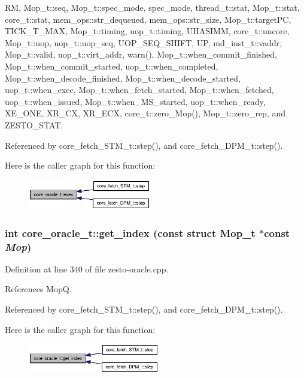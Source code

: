 RM, Mop\_\-t::seq, Mop\_\-t::spec\_\-mode, spec\_\-mode, thread\_\-t::stat, Mop\_\-t::stat, core\_\-t::stat, mem\_\-ops::str\_\-dequeued, mem\_\-ops::str\_\-size, Mop\_\-t::targetPC, TICK\_\-T\_\-MAX, Mop\_\-t::timing, uop\_\-t::timing, UHASIMM, core\_\-t::uncore, Mop\_\-t::uop, uop\_\-t::uop\_\-seq, UOP\_\-SEQ\_\-SHIFT, UP, md\_\-inst\_\-t::vaddr, Mop\_\-t::valid, uop\_\-t::virt\_\-addr, warn(), Mop\_\-t::when\_\-commit\_\-finished, Mop\_\-t::when\_\-commit\_\-started, uop\_\-t::when\_\-completed, Mop\_\-t::when\_\-decode\_\-finished, Mop\_\-t::when\_\-decode\_\-started, uop\_\-t::when\_\-exec, Mop\_\-t::when\_\-fetch\_\-started, Mop\_\-t::when\_\-fetched, uop\_\-t::when\_\-issued, Mop\_\-t::when\_\-MS\_\-started, uop\_\-t::when\_\-ready, XE\_\-ONE, XR\_\-CX, XR\_\-ECX, core\_\-t::zero\_\-Mop(), Mop\_\-t::zero\_\-rep, and ZESTO\_\-STAT.

Referenced by core\_\-fetch\_\-STM\_\-t::step(), and core\_\-fetch\_\-DPM\_\-t::step().

Here is the caller graph for this function:\nopagebreak
\begin{figure}[H]
\begin{center}
\leavevmode
\includegraphics[width=152pt]{classcore__oracle__t_1ac2b1204cef575e22d1d03c3ce4cff9_icgraph}
\end{center}
\end{figure}
\subsubsection[{get\_\-index}]{\setlength{\rightskip}{0pt plus 5cm}int core\_\-oracle\_\-t::get\_\-index (const struct {\bf Mop\_\-t} $\ast$const  {\em Mop})}\label{classcore__oracle__t_2c1b1e382fd5cd3a13a52560adf9ce7b}




Definition at line 340 of file zesto-oracle.cpp.

References MopQ.

Referenced by core\_\-fetch\_\-STM\_\-t::step(), and core\_\-fetch\_\-DPM\_\-t::step().

Here is the caller graph for this function:\nopagebreak
\begin{figure}[H]
\begin{center}
\leavevmode
\includegraphics[width=163pt]{classcore__oracle__t_2c1b1e382fd5cd3a13a52560adf9ce7b_icgraph}
\end{center}
\end{figure}
